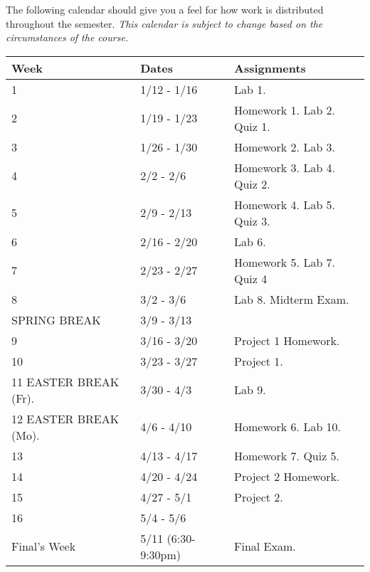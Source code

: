 \documentclass[10pt]{article}
\begin{document}
The following calendar should give you a feel for how work is distributed throughout the semester.  \textit{This calendar is subject to change based on the circumstances of the course.}
\begin{center}
\begin{tabular}{|l|l|l|}
\hline 
Week & Dates & Assignments \\
\hline
1 & 1/12 - 1/16 &  Lab 1.  \\
\hline
2 & 1/19 - 1/23 & Homework 1. Lab 2. Quiz 1. \\
\hline
3 & 1/26 - 1/30 & Homework 2. Lab 3.  \\
\hline
4 & 2/2 - 2/6 & Homework 3. Lab 4. Quiz 2.\\
\hline
5 & 2/9 - 2/13 & Homework 4. Lab 5. Quiz 3.  \\
\hline
6 & 2/16 - 2/20 & Lab 6. \\
\hline
7 & 2/23 - 2/27 & Homework 5. Lab 7.  Quiz 4  \\
\hline
8 & 3/2 - 3/6 & Lab 8. Midterm Exam. \\
\hline 
SPRING BREAK & 3/9 - 3/13 & \\
\hline
9 & 3/16 - 3/20 & Project 1 Homework.  \\
\hline
10 & 3/23 - 3/27 & Project 1.  \\
\hline
11 EASTER BREAK (Fr). & 3/30 - 4/3 & Lab 9.  \\
\hline
12 EASTER BREAK (Mo). & 4/6 - 4/10 & Homework 6. Lab 10.  \\
\hline
13 & 4/13 - 4/17 & Homework 7. Quiz 5.   \\
\hline
14 & 4/20 - 4/24 & Project 2 Homework.  \\
\hline
15 & 4/27 - 5/1 & Project 2.  \\ 
\hline
16 & 5/4 - 5/6 &   \\
\hline
Final's Week & 5/11 (6:30-9:30pm) & Final Exam.   \\ 
\hline
\end{tabular}
\end{center}
\end{document}
